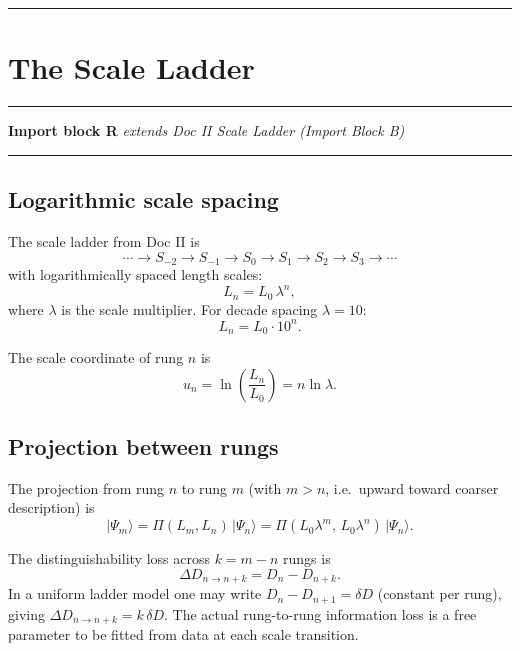 \documentclass[11pt, a4paper, oneside]{article}
\theoremstyle{definition}
\theoremstyle{plain}
\theoremstyle{remark}
\begin{document}
\noindent\rule{\linewidth}{0.4pt}

\section{The Scale Ladder}
\label{sec:scale_ladder}

\noindent\rule{\linewidth}{0.8pt}
\textbf{Import block R} \hfill
  \textit{extends Doc II Scale Ladder (Import Block B)}
\noindent\rule{\linewidth}{0.4pt}

\subsection{Logarithmic scale spacing}

The scale ladder from Doc II is
\begin{equation}
  \cdots \to S_{-2} \to S_{-1} \to S_0 \to S_1 \to S_2 \to S_3 \to \cdots
  \label{eq:scale_ladder}
\end{equation}
with logarithmically spaced length scales:
\begin{equation}
  L_n = L_0\,\lambda^n,
  \label{eq:Ln}
\end{equation}
where $\lambda$ is the scale multiplier.
For decade spacing $\lambda = 10$:
\begin{equation}
  L_n = L_0 \cdot 10^n.
  \label{eq:Ln_decade}
\end{equation}

The scale coordinate of rung $n$ is
\begin{equation}
  u_n = \ln\!\left(\frac{L_n}{L_0}\right) = n\ln\lambda.
  \label{eq:un}
\end{equation}

\subsection{Projection between rungs}

The projection from rung $n$ to rung $m$ (with $m > n$, i.e.\ upward
toward coarser description) is
\begin{equation}
  |\Psi_m\rangle = \Pi(L_m, L_n)\,|\Psi_n\rangle
  = \Pi(L_0\lambda^m,\, L_0\lambda^n)\,|\Psi_n\rangle.
  \label{eq:proj_rungs}
\end{equation}

The distinguishability loss across $k = m - n$ rungs is
\begin{equation}
  \Delta D_{n \to n+k} = D_n - D_{n+k}.
  \label{eq:D_rungs}
\end{equation}
In a uniform ladder model one may write $D_n - D_{n+1} = \delta D$ (constant
per rung), giving $\Delta D_{n \to n+k} = k\,\delta D$.
The actual rung-to-rung information loss is a free parameter to be fitted
from data at each scale transition.
\end{document}
